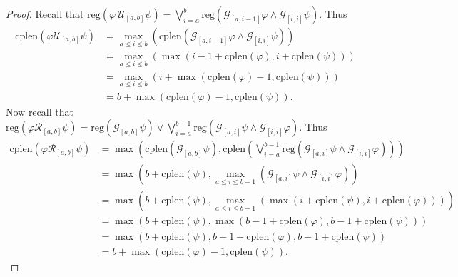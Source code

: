 \documentclass[runningheads]{llncs}
\renewcommand{\phi}{\varphi}
\begin{document}
\begin{proof}
 Recall that $\text{reg}(\phi \ \mathcal{U}_{[a,b]} \psi) =  \bigvee_{i=a}^{b} \text{reg}\left(\mathcal{G}_{[a,i-1]}\phi \land \mathcal{G}_{[i, i]} \psi\right)$. Thus
 \begin{align*}
     \text{cplen}(\phi \mathcal{U}_{[a,b]} \psi) &= \max_{a \leq i \leq b} \left( \text{cplen}(\mathcal{G}_{[a, i-1]} \phi \land \mathcal{G}_{[i,i]} \psi) \right)\\
     &= \max_{a \leq i \leq b} \left( \max(i-1 + \text{cplen}(\phi), i + \text{cplen}(\psi))\right)\\
     &= \max_{a \leq i \leq b} \left(i + \max(\text{cplen}(\phi) - 1, \text{cplen}(\psi))\right)\\
     &= b + \max(\text{cplen}(\phi) - 1, \text{cplen}(\psi)).
 \end{align*}
 Now recall that $\text{reg}(\phi \mathcal{R}_{[a,b]} \psi) =  \text{reg}\left(\mathcal{G}_{[a,b]}\psi\right) \lor \bigvee_{i=a}^{b-1} \text{reg}\left(\mathcal{G}_{[a,i]}\psi \land \mathcal{G}_{[i, i]} \phi\right)$. Thus%
 \begin{align*}
     \text{cplen}(\phi \mathcal{R}_{[a,b]} \psi) &= \max \left( \text{cplen}(\mathcal{G}_{[a,b]} \psi), \text{cplen}\left( \bigvee_{i=a}^{b-1} \text{reg}\left(\mathcal{G}_{[a,i]}\psi \land \mathcal{G}_{[i, i]} \phi\right) \right)  \right)\\
     &= \max\left( b + \text{cplen}(\psi), \max_{a \leq i \leq b-1} \left(\mathcal{G}_{[a,i]}\psi \land \mathcal{G}_{[i, i]} \phi\right) \right)\\
     &= \max \left( b + \text{cplen}(\psi), \max_{a \leq i \leq b-1} \left(\max(i + \text{cplen}(\psi), i + \text{cplen}(\phi))\right) \right)\\
     &= \max \left( b + \text{cplen}(\psi), \max(b-1+\text{cplen}(\phi), b-1+\text{cplen}(\psi))\right)\\
     &= \max(b + \text{cplen}(\psi), b-1+\text{cplen}(\phi), b-1+\text{cplen}(\psi))\\
     &= b + \max(\text{cplen}(\phi)-1, \text{cplen}(\psi)). 
 \end{align*}
 \end{proof}
\end{document}
